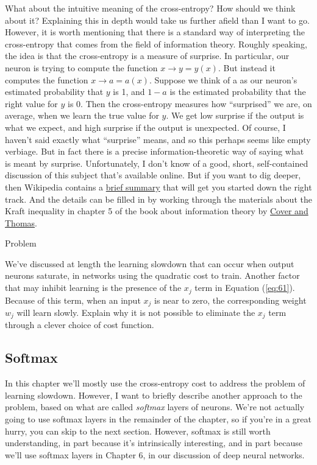 \documentclass[a4paper,twoside,10pt]{book}
\begin{document}
What about the intuitive meaning of the cross-entropy? How should we think about it? Explaining this in depth would take us further afield than I want to go. However, it is worth mentioning that there is a standard way of interpreting the cross-entropy that comes from the field of information theory. Roughly speaking, the idea is that the cross-entropy is a measure of surprise. In particular, our neuron is trying to compute the function $x\to y=y(x)$. But instead it computes the function $x \to a=a(x)$. Suppose we think of a as our neuron's estimated probability that $y$ is 1, and $1-a$ is the estimated probability that the right value for $y$ is 0. Then the cross-entropy measures how ``surprised'' we are, on average, when we learn the true value for $y$. We get low surprise if the output is what we expect, and high surprise if the output is unexpected. Of course, I haven't said exactly what ``surprise'' means, and so this perhaps seems like empty verbiage. But in fact there is a precise information-theoretic way of saying what is meant by surprise. Unfortunately, I don't know of a good, short, self-contained discussion of this subject that's available online. But if you want to dig deeper, then Wikipedia contains a \href{http://en.wikipedia.org/wiki/Cross_entropy#Motivation}{brief summary} that will get you started down the right track. And the details can be filled in by working through the materials about the Kraft inequality in chapter 5 of the book about information theory by \href{http://books.google.ca/books?id=VWq5GG6ycxMC}{Cover and Thomas}.


\begin{exercize}{Problem}
	\item We've discussed at length the learning slowdown that can occur when output neurons saturate, in networks using the quadratic cost to train. Another factor that may inhibit learning is the presence of the $x_j$ term in Equation (\ref{eq:61}). Because of this term, when an input $x_j$ is near to zero, the corresponding weight $w_j$ will learn slowly. Explain why it is not possible to eliminate the $x_j$ term through a clever choice of cost function.
\end{exercize}

\subsection{Softmax}
In this chapter we'll mostly use the cross-entropy cost to address the problem of learning slowdown. However, I want to briefly describe another approach to the problem, based on what are called \textit{softmax} layers of neurons. We're not actually going to use softmax layers in the remainder of the chapter, so if you're in a great hurry, you can skip to the next section. However, softmax is still worth understanding, in part because it's intrinsically interesting, and in part because we'll use softmax layers in Chapter 6, in our discussion of deep neural networks.
\end{document}

